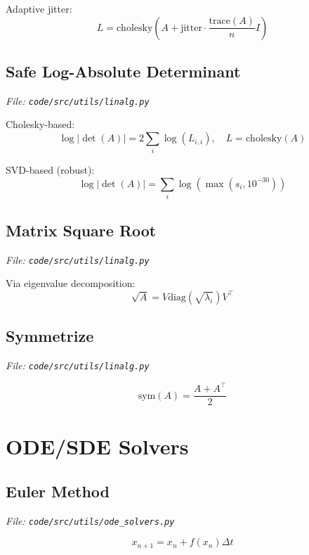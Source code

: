 \documentclass[12pt]{article}
\begin{document}
Adaptive jitter:
\begin{equation}
L = \text{cholesky}(A + \text{jitter} \cdot \frac{\text{trace}(A)}{n} I)
\end{equation}

\subsection{Safe Log-Absolute Determinant}
\textit{File: \texttt{code/src/utils/linalg.py}}

Cholesky-based:
\begin{equation}
\log|\det(A)| = 2 \sum_i \log(L_{i,i}), \quad L = \text{cholesky}(A)
\end{equation}

SVD-based (robust):
\begin{equation}
\log|\det(A)| = \sum_i \log(\max(s_i, 10^{-30}))
\end{equation}

\subsection{Matrix Square Root}
\textit{File: \texttt{code/src/utils/linalg.py}}

Via eigenvalue decomposition:
\begin{equation}
\sqrt{A} = V \text{diag}(\sqrt{\lambda_i}) V^\top
\end{equation}

\subsection{Symmetrize}
\textit{File: \texttt{code/src/utils/linalg.py}}

\begin{equation}
\text{sym}(A) = \frac{A + A^\top}{2}
\end{equation}

\section{ODE/SDE Solvers}

\subsection{Euler Method}
\textit{File: \texttt{code/src/utils/ode\_solvers.py}}

\begin{equation}
x_{n+1} = x_n + f(x_n) \Delta t
\end{equation}
\end{document}
